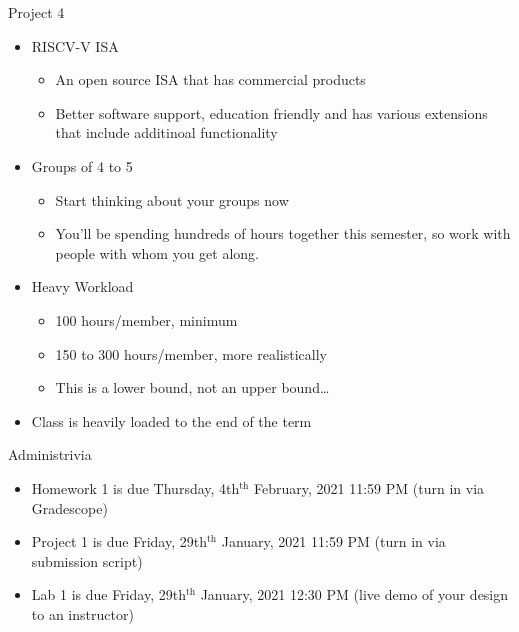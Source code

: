 \documentclass[table,dvipsnames,colorlinks=true]{beamer}
\begin{document}
\begin{frame}{Project 4}
    \begin{itemize}
        \item RISCV-V ISA
            \begin{itemize}
                \item An open source ISA that has commercial products
				\item Better software support, education friendly and has various extensions that include additinoal functionality
            \end{itemize}
        \item Groups of 4 to 5
            \begin{itemize}
                \item Start thinking about your groups now
                \item You'll be spending hundreds of hours together this
                    semester, so work with people with whom you get along.
            \end{itemize}
        \item Heavy Workload
            \begin{itemize}
                \item 100 hours/member, minimum
                \item 150 to 300 hours/member, more realistically
                \item This is a lower bound, not an upper bound\dots
            \end{itemize}
        \item Class is heavily loaded to the end of the term
    \end{itemize}
\end{frame}

\begin{frame}{Administrivia}
    \begin{itemize}
        \item Homework 1 is due Thursday, 4th$^{\text{th}}$ February, 2021 11:59 PM (turn in via Gradescope)
        \item Project 1 is due Friday, 29th$^{\text{th}}$ January, 2021 11:59 PM (turn in via submission script)
        \item  Lab 1 is due Friday, 29th$^{\text{th}}$ January, 2021 12:30 PM (live demo of your design to an instructor)
    \end{itemize}
\end{frame}
\end{document}
